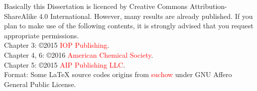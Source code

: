 
 {\small Basically this Dissertation is licenced by Creative Commons Attribution-ShareAlike 4.0 International. However, many results are already published. If you plan to make use of the following contents, it is strongly advised that you request appropriate permissions.} \\
 Chapter 3: \copyright 2015 \textcolor{Red}{IOP Publishing}. \\
 Chapter 4, 6: \copyright 2016 \textcolor{Red}{American Chemical Society}. \\
 Chapter 5: \copyright 2015 \textcolor{Red}{AIP Publishing LLC}. \\
 Format: Some \LaTeX \xspace source codes origins from \textcolor{Red}{suchow} under GNU Affero General Public License. 